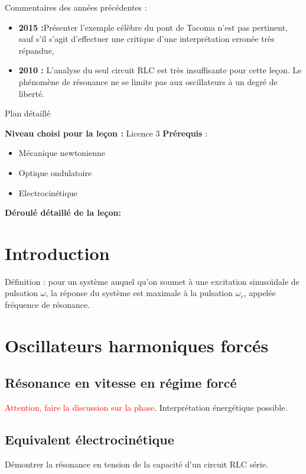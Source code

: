 \begin{reportBlock}{Commentaires des années précédentes :}
    \begin{itemize}
        \item \textbf{2015 :}Présenter l’exemple célèbre du pont de Tacoma n’est pas pertinent, sauf s’il s’agit d’effectuer une critique d’une interprétation erronée très répandue,
        \item \textbf{2010 :} L’analyse du seul circuit RLC est très insuffisante pour cette leçon. Le phénomène de résonance ne se limite pas aux oscillateurs à un degré de liberté.
    \end{itemize}
\end{reportBlock}
\begin{reportBlock}{Plan détaillé}

  \textbf{Niveau choisi pour la leçon :} Licence 3
  \newline
  \textbf{Prérequis} : \begin{itemize}
      \item Mécanique newtonienne
      \item Optique ondulatoire
      \item Electrocinétique
  \end{itemize}

  \textbf{Déroulé détaillé de la leçon: }  
  
\section*{Introduction}
Définition : pour un système auquel qu'on soumet à une excitation sinusoïdale de pulsation $\omega$, la réponse du système est maximale à la pulsation $\omega_r$, appelée fréquence de résonance.

\section{Oscillateurs harmoniques forcés}

\subsection{Résonance en vitesse en régime forcé} 

\textcolor{red}{Attention, faire la discussion sur la phase}. Interprétation énergétique possible.

\subsection{Equivalent électrocinétique}
Démontrer la résonance en tension de la capacité d'un circuit RLC série.\\


\end{reportBlock}
